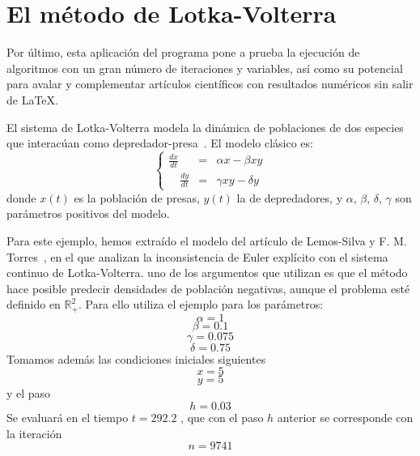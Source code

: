 \documentclass{book}
\begin{document}
\section{El método de Lotka-Volterra} \label{sec:l-v}
Por último, esta aplicación del programa pone a prueba la ejecución de algoritmos con un gran número de iteraciones y variables, así como su potencial para avalar y complementar artículos científicos con resultados numéricos sin salir de LaTeX.

El sistema de Lotka-Volterra modela la dinámica de poblaciones de dos especies que interacúan como depredador-presa~\cite{lemos-silva_lotka-volterra_2023}. El modelo clásico es:
\[
\left \{
\begin{array}{rrrr}
    \frac{dx}{dt} & = &\alpha x - \beta x y \\
    \quad \frac{dy}{dt} & = &\gamma x y - \delta y
\end{array}
\right .
\]
donde $x(t)$ es la población de presas, $y(t)$ la de depredadores, y $\alpha$, $\beta$,
$\delta$, $\gamma$ son parámetros positivos del modelo. 

Para este ejemplo, hemos extraído el modelo del artículo de Lemos-Silva y F. M. Torres~\cite{lemos-silva_lotka-volterra_2023}, en el que analizan la inconsistencia de Euler explícito con el sistema continuo de Lotka-Volterra. uno de los argumentos que utilizan es que el método hace posible predecir densidades de población negativas, aunque el problema esté definido en $\mathbb{R}^2_+$. 
Para ello utiliza el ejemplo para los parámetros:
\begin{equation}
    \alpha = 1
    \label{eq:calc:alpha}
\end{equation}
\begin{equation}
    \beta = 0.1
    \label{eq:calc:beta}
\end{equation}
\begin{equation}
    \gamma = 0.075
    \label{eq:calc:gamma}
\end{equation}
\begin{equation}
    \delta = 0.75
    \label{eq:calc:delta}
\end{equation}
Tomamos además las condiciones iniciales siguientes
\begin{equation}
    x = 5
    \label{eq:calc:x}
\end{equation}
\begin{equation}
    y = 5
    \label{eq:calc:y}
\end{equation}
y el paso
\begin{equation}
    h = 0.03
    \label{eq:calc:h}
\end{equation}
Se evaluará en el tiempo $t=292.2$ , que con el paso $h$ anterior se corresponde con la iteración
\begin{equation}
    n = 9741
    \label{eq:calc:n}
\end{equation}
\end{document}
